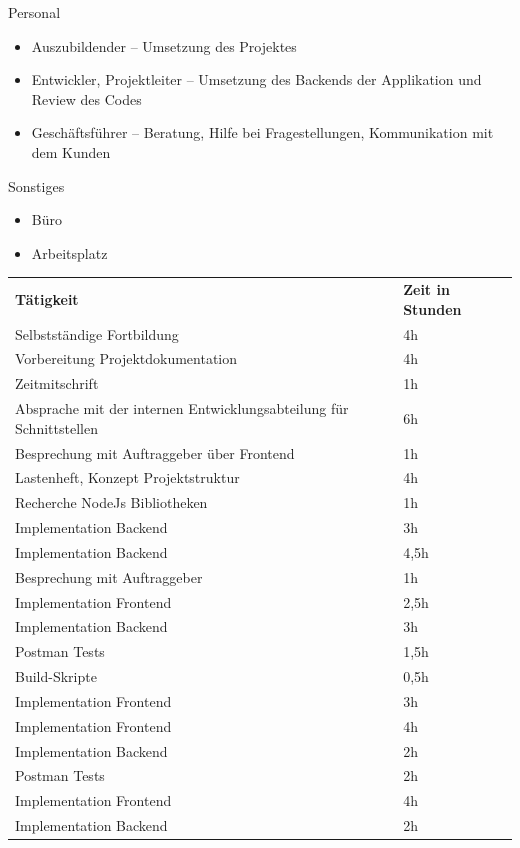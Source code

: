  Personal
	\begin{itemize}
		\item Auszubildender -- Umsetzung des Projektes
		\item Entwickler, Projektleiter – Umsetzung des Backends der Applikation und Review des Codes
		\item Geschäftsführer – Beratung, Hilfe bei Fragestellungen, Kommunikation mit dem Kunden
	\end{itemize}
Sonstiges
	\begin{itemize}
		\item Büro
		\item Arbeitsplatz
	\end{itemize}
\clearpage




\begin{table}[htbp]
	\centering
	\begin{tabular}{ l l }
	\hline
	\rowcolor[HTML]{127017}
	\textbf{\color{white}Tätigkeit} & \textbf{\color{white}Zeit in Stunden} \\
	Selbstständige Fortbildung & 4h \\
	Vorbereitung Projektdokumentation & 4h \\
	Zeitmitschrift & 1h \\
	Absprache mit der internen Entwicklungsabteilung für Schnittstellen & 6h \\
	Besprechung mit Auftraggeber über Frontend & 1h \\
	Lastenheft, Konzept Projektstruktur & 4h \\
	Recherche NodeJs Bibliotheken & 1h \\
	Implementation Backend & 3h \\
	Implementation Backend & 4,5h \\
	Besprechung mit Auftraggeber & 1h \\
	Implementation Frontend & 2,5h \\
	Implementation Backend & 3h \\
	Postman Tests & 1,5h \\
	Build-Skripte & 0,5h \\
	Implementation Frontend & 3h \\
	Implementation Frontend & 4h \\
	Implementation Backend & 2h \\
	Postman Tests & 2h \\
	Implementation Frontend & 4h \\
	Implementation Backend & 2h \\

\end{tabular}
\end{table}
